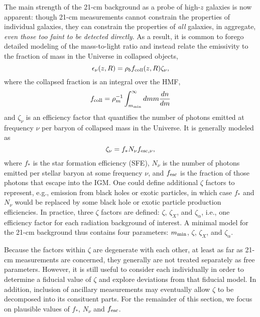 The main strength of the 21-cm background as a probe of high-$z$ galaxies is now apparent: though 21-cm measurements cannot constrain the properties of individual galaxies, they can constrain the properties of \textit{all} galaxies, in aggregate, \textit{even those too faint to be detected directly}. As a result, it is common to forego detailed modeling of the mass-to-light ratio and instead relate the emissivity to the fraction of mass in the Universe in collapsed objects,
\begin{equation}
	\epsilon_{\nu}(z, R) = \rho_b f_{\text{coll}}(z, R) \zeta_{\nu} ,
\end{equation}
where the collapsed fraction is an integral over the HMF,
\begin{equation}
	f_{\text{coll}} = \rho_m^{-1} \int_{m_{\text{min}}}^{\infty} dm m \frac{dn}{dm}
\end{equation}
and $\zeta_{\nu}$ is an efficiency factor that quantifies the number of photons emitted at frequency $\nu$ per baryon of collapsed mass in the Universe. It is generally modeled as
\begin{equation}
	\zeta_{\nu} = f_{\ast} N_{\nu} f_{\text{esc},\nu} , \label{eq:zeta}
\end{equation}
where $f_{\ast}$ is the star formation efficiency (SFE), $N_{\nu}$ is the number of photons emitted per stellar baryon at some frequency $\nu$, and $f_{\text{esc}}$ is the fraction of those photons that escape into the IGM. One could define additional $\zeta$ factors to represent, e.g., emission from black holes or exotic particles, in which case $f_{\ast}$ and $N_{\nu}$ would be replaced by some black hole or exotic particle production efficiencies. In practice, three $\zeta$ factors are defined: $\zeta$, $\zeta_X$, and $\zeta_{\alpha}$, i.e., one efficiency factor for each radiation background of interest. A minimal model for the 21-cm background thus contains four parameters: $m_{\text{min}}$, $\zeta$, $\zeta_X$, and $\zeta_{\alpha}$. 

Because the factors within $\zeta$ are degenerate with each other, at least as far as 21-cm measurements are concerned, they generally are not treated separately as free parameters. However, it is still useful to consider each individually in order to determine a fiducial value of $\zeta$ and explore deviations from that fiducial model. In addition, inclusion of ancillary measurements may eventually allow $\zeta$ to be decomposed into its consituent parts. For the remainder of this section, we focus on plausible values of $f_{\ast}$, $N_{\nu}$ and $f_{\text{esc}}$.


